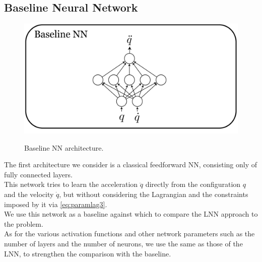 \documentclass[a4paper]{article}
\begin{document}
\subsection{Baseline Neural Network}
\begin{figure}
\begin{center}
    \label{img:baseline_arch}
    \includegraphics[scale=0.1]{./img/baseline_nn.png}  
    \caption{Baseline NN architecture.}
\end{center}
\end{figure}

The first architecture we consider is a classical feedforward NN, consisting only of fully connected layers.\\ This network tries to learn the acceleration $\ddot{q}$ directly from the configuration $q$ and the velocity $\dot{q}$, but without considering the Lagrangian and the constraints imposed by it via \eqref{eq:paramlag3}.\\ We use this network as a baseline against which to compare the LNN approach to the problem.\\ As for the various activation functions and other network parameters such as the number of layers and the number of neurons, we use the same as those of the LNN, to strengthen the comparison with the baseline.

\end{document}
